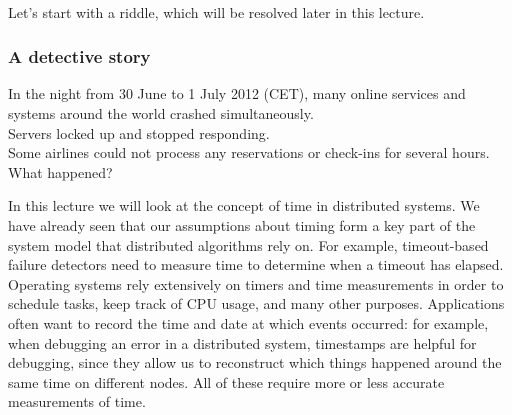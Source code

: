 \begin{frame}
    \begin{center}
        {\Large{\color{tumblue}{Time, clocks, and ordering of events}}} \\[2em]
        \mydetails
    \end{center}
\end{frame}

Let's start with a riddle, which will be resolved later in this lecture.

\begin{frame}
    \label{s:mystery}
    \frametitle{A detective story}
    In the night from 30 June to 1 July 2012 (CET), many online services and systems around the world crashed simultaneously.\\[1em]
    Servers locked up and stopped responding.\\[1em]
    Some airlines could not process any reservations or check-ins for several hours.\\[1em]
    What happened?
\end{frame}
\label{l:mystery}

In this lecture we will look at the concept of time in distributed systems.
We have already seen that our assumptions about timing form a key part of the system model that distributed algorithms rely on.
For example, timeout-based failure detectors need to measure time to determine when a timeout has elapsed.
Operating systems rely extensively on timers and time measurements in order to schedule tasks, keep track of CPU usage, and many other purposes.
Applications often want to record the time and date at which events occurred: for example, when debugging an error in a distributed system, timestamps are helpful for debugging, since they allow us to reconstruct which things happened around the same time on different nodes.
All of these require more or less accurate measurements of time.

